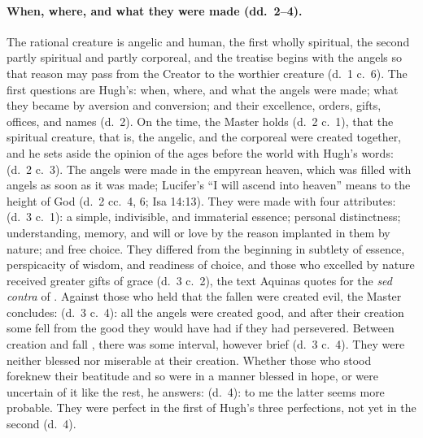 \paragraph{When, where, and what they were made (dd.~2--4).} The rational
creature is angelic and human, the first wholly spiritual, the second partly
spiritual and partly corporeal, and the treatise begins with the angels so
that reason may pass from the Creator to the worthier creature (d.~1 c.~6).
The first questions are Hugh's: when, where, and what the angels were made;
what they became by aversion and conversion; and their excellence, orders,
gifts, offices, and names (d.~2). On the time, the Master holds
 (d.~2 c.~1), that the spiritual creature, that is, the angelic, and the
corporeal were created together, and he sets aside the opinion of the ages
before the world with Hugh's words:  (d.~2 c.~3). The angels were made in
the empyrean heaven, which was filled with angels as soon as it was made;
Lucifer's
``I will ascend into heaven'' means to the height of God (d.~2 cc.~4, 6;
Isa 14:13). They were made with four attributes:  (d.~3 c.~1): a simple, indivisible, and
immaterial essence; personal distinctness; understanding, memory, and will or
love by the reason implanted in them by nature; and free choice. They
differed from the beginning in subtlety of essence, perspicacity of wisdom,
and readiness of choice, and those who excelled by nature received greater
gifts of grace (d.~3 c.~2), the text Aquinas quotes for the \emph{sed
contra} of . Against those who held that the fallen were
created evil, the Master concludes:  (d.~3 c.~4): all the angels were
created good, and after their creation some fell from the good they would
have had if they had persevered. Between creation and fall , there was some interval, however brief
(d.~3 c.~4). They were neither
blessed nor miserable at their creation. Whether those who stood foreknew
their beatitude and so were in a manner blessed in hope, or were uncertain
of it like the rest, he answers:  (d.~4): to me the latter seems more probable. They were
perfect in the first of Hugh's three perfections, not yet in the second
(d.~4).

